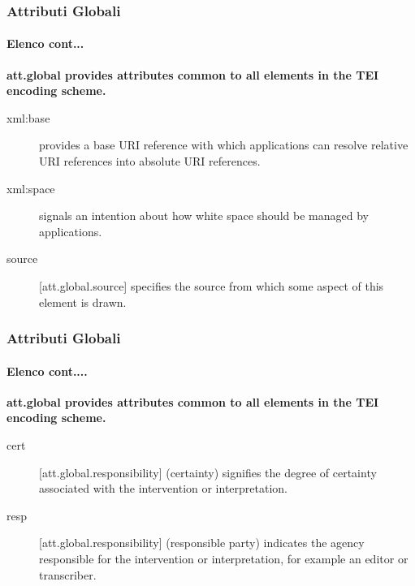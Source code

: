 \begin{frame}
    \frametitle{Attributi Globali}
    \framesubtitle{Elenco cont...}
    \addtocounter{nframe}{1}


\textbf{\textmd{att.global} provides attributes common to all elements in the TEI encoding scheme.}

\begin{description}
    \item [xml:base]	provides a base URI reference with which applications can resolve relative URI references into absolute URI references.
    \item [xml:space]	signals an intention about how white space should be managed by applications.
    \item [source] [att.global.source]	specifies the source from which some aspect of this element is drawn.
\end{description}

\end{frame}

\begin{frame}
    \frametitle{Attributi Globali}
    \framesubtitle{Elenco cont....}
    \addtocounter{nframe}{1}


\textbf{\textmd{att.global} provides attributes common to all elements in the TEI encoding scheme.}

\begin{description}
    \item [cert] [att.global.responsibility]	(certainty) signifies the degree of certainty associated with the intervention or interpretation.
    \item [resp] [att.global.responsibility]	(responsible party) indicates the agency responsible for the intervention or interpretation, for example an editor or transcriber.
\end{description}

\end{frame}




